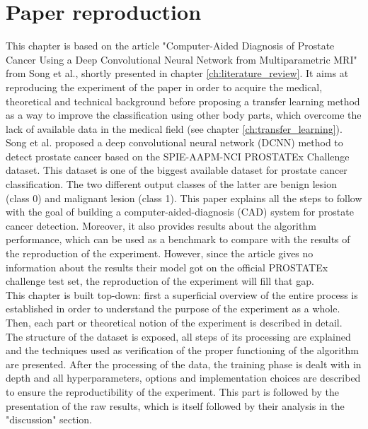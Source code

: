 
\chapter{Paper reproduction}
\label{ch:paper_reproduction}
This chapter is based on the article "Computer-Aided Diagnosis of Prostate Cancer Using a Deep Convolutional Neural Network from Multiparametric MRI" from Song et al.\cite{07}, shortly presented in chapter \ref{ch:literature_review}. It aims at reproducing the experiment of the paper in order to acquire the medical, theoretical and technical background before proposing a transfer learning method as a way to improve the classification using other body parts, which overcome the lack of available data in the medical field (see chapter \ref{ch:transfer_learning}).\\
Song et al. \cite{07} proposed a deep convolutional neural network (DCNN) method to detect prostate cancer based on the SPIE-AAPM-NCI PROSTATEx Challenge dataset. This dataset is one of the biggest available dataset for prostate cancer classification. The two different output classes of the latter are benign lesion (class 0) and malignant lesion (class 1). This paper explains all the steps to follow with the goal of building a computer-aided-diagnosis (CAD) system for prostate cancer detection. Moreover, it also provides results about the algorithm performance, which can be used as a benchmark to compare with the results of the reproduction of the experiment. However, since the article gives no information about the results their model got on the official PROSTATEx challenge test set, the reproduction of the experiment will fill that gap.\\
This chapter is built top-down: first a superficial overview of the entire process is established in order to understand the purpose of the experiment as a whole. Then, each part or theoretical notion of the experiment is described in detail. The structure of the dataset is exposed, all steps of its processing are explained and the techniques used as verification of the proper functioning of the algorithm are presented. After the processing of the data, the training phase is dealt with in depth and all hyperparameters, options and implementation choices are described to ensure the reproductibility of the experiment. This part is followed by the presentation of the raw results, which is itself followed by their analysis in the "discussion" section.

